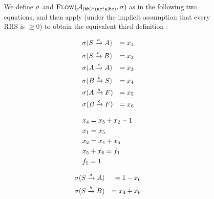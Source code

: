\documentclass[acmsmall,review,anonymous,screen]{acmart}\settopmatter{printfolios=true,printccs=true,printacmref=true}
\theoremstyle{definition}
\begin{document}
\begin{figure}[ht]
  We define $\operatorname{\sigma}$ and $\textsc{Flow}(\mathcal{A}_{\mathtt{(bb)^\ast(ac^\ast{}a|bc)}}{}, \operatorname{\sigma})$ as in the following two
  equations, and then apply \EquationReasoning{} (under the implicit assumption
  that every RHS is $\geq 0$) to obtain the equivalent third definition :
  \begin{minipage}[b]{0.3\linewidth}
    \begin{equation*}
      \begin{aligned}
        & \operatorname{\sigma}(S \xrightarrow{a} A) & = x_1 \\
        & \operatorname{\sigma}(S \xrightarrow{b} B) & = x_2 \\
        & \operatorname{\sigma}(A \xrightarrow{c} A)  & = x_3  \\
        & \operatorname{\sigma}(B \xrightarrow{b} S) & = x_4 \\
        & \operatorname{\sigma}(A \xrightarrow{a} F) & = x_5 \\
        & \operatorname{\sigma}(B \xrightarrow{c} F) & = x_6 \\
      \end{aligned}
    \end{equation*}    
  \end{minipage}
  \hspace{0.5cm}
  \begin{minipage}[b]{0.3\linewidth}
    \begin{equation*}
      \begin{aligned}
        &  x_4 = x_5 + x_2 - 1 \\
        & x_1 = x_5 \\
        & x_2 = x_4 + x_6 \\
        & x_5 + x_6 = f_1 \\
        & f_1 = 1 \\
      \end{aligned}  
    \end{equation*}    
  \end{minipage}
  \begin{minipage}[b]{0.3\linewidth}
    \begin{equation*}
      \begin{aligned}
        & \Filter(\FromLabelTo{S}{a}{A}) & = 1 - \TransitionVar_6 \\
        & \Filter(\FromLabelTo{S}{b}{B}) & = \TransitionVar_4 + \TransitionVar_6 \\

\end{aligned}
\end{equation*}
\end{minipage}
\end{figure}
\end{document}
